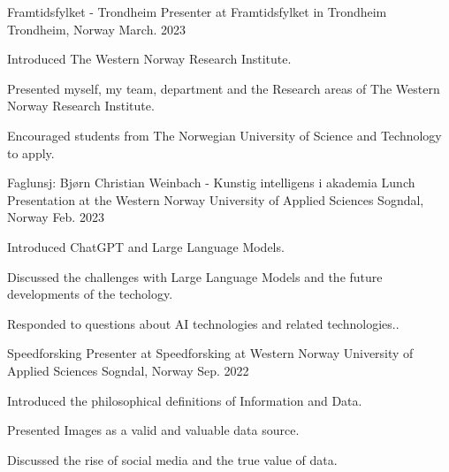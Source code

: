 
\begin{cventries}

  \cventry
    {Framtidsfylket - Trondheim} %
    {Presenter at Framtidsfylket in Trondheim} %
    {Trondheim, Norway} %
    {March. 2023} %
    {
      \begin{cvitems} %
        \item {Introduced The Western Norway Research Institute.}
        \item {Presented myself, my team, department and the Research areas of The Western Norway Research Institute.}
        \item {Encouraged students from The Norwegian University of Science and Technology to apply}.
      \end{cvitems}
  }

  \cventry
    {Faglunsj: Bjørn Christian Weinbach - Kunstig intelligens i akademia} %
    {Lunch Presentation at the Western Norway University of Applied Sciences} %
    {Sogndal, Norway} %
    {Feb. 2023} %
    {
      \begin{cvitems} %
        \item {Introduced ChatGPT and Large Language Models.}
        \item {Discussed the challenges with Large Language Models and the future developments of the techology.}
        \item {Responded to questions about AI technologies and related technologies.}.
      \end{cvitems}
    }

  \cventry
    {Speedforsking} %
    {Presenter at Speedforsking at Western Norway University of Applied Sciences} %
    {Sogndal, Norway} %
    {Sep. 2022} %
    {
      \begin{cvitems} %
        \item {Introduced the philosophical definitions of Information and Data.}
        \item {Presented Images as a valid and valuable data source.}
        \item {Discussed the rise of social media and the true value of data.}
      \end{cvitems}
    }
\end{cventries}
